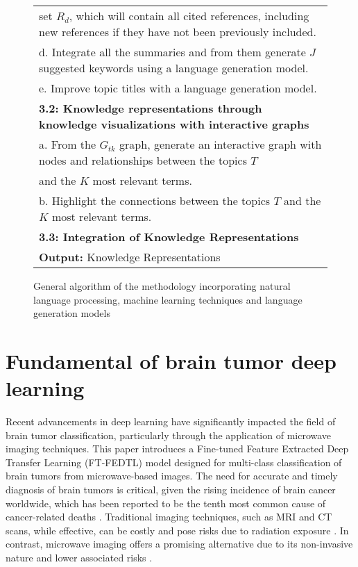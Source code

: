 \documentclass[runningheads]{llncs}
\begin{document}
\begin{figure*}[!h]
{\begin{tabular}{l}
			\quad \quad \quad set $R_d$, which will contain all cited references, including new references if they have not been previously included.\\
			\quad \quad d. Integrate all the summaries and from them generate $J$ suggested keywords using a language generation model.\\
			\quad \quad e. Improve topic titles with a language generation model.\\
			\quad \textbf{3.2: Knowledge representations through knowledge visualizations with interactive graphs}\\
			\quad \quad a. From the $G_{tk}$ graph, generate an interactive graph with nodes and relationships between the topics $T$\\
			\quad \quad and the $K$ most relevant terms.\\
			\quad \quad b. Highlight the connections between the topics $T$ and the $K$ most relevant terms.\\
			\quad \textbf{3.3: Integration of Knowledge Representations}\\
			\hline
			\textbf{Output:} Knowledge Representations \\
			\hline
		\end{tabular}
	}
	\caption{\centering General algorithm of the methodology incorporating natural language processing, machine learning techniques and language generation models}
	\label{tab:Algorithm}
\end{figure*}

\FloatBarrier


\section{Fundamental of brain tumor deep learning}
Recent advancements in deep learning have significantly impacted the field of brain tumor classification, particularly through the application of microwave imaging techniques. This paper introduces a Fine-tuned Feature Extracted Deep Transfer Learning (FT-FEDTL) model designed for multi-class classification of brain tumors from microwave-based images. The need for accurate and timely diagnosis of brain tumors is critical, given the rising incidence of brain cancer worldwide, which has been reported to be the tenth most common cause of cancer-related deaths \cite{Amran_2024}. Traditional imaging techniques, such as MRI and CT scans, while effective, can be costly and pose risks due to radiation exposure \cite{Chun_2025}. In contrast, microwave imaging offers a promising alternative due to its non-invasive nature and lower associated risks \cite{Amran_2024}.
\end{document}
